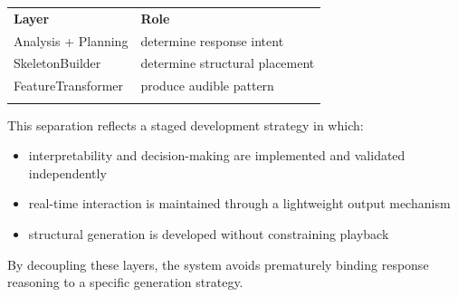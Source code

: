 {\def\LTcaptype{none} %
\begin{longtable}[]{@{}
  >{\raggedright\arraybackslash}p{}
  >{\raggedright\arraybackslash}p{}@{}}
\toprule\noalign{}
\begin{minipage}[b]{\linewidth}\centering
\textbf{Layer}
\end{minipage} & \begin{minipage}[b]{\linewidth}\centering
\textbf{Role}
\end{minipage} \\
\begin{minipage}[b]{\linewidth}\raggedright
Analysis + Planning
\end{minipage} & \begin{minipage}[b]{\linewidth}\raggedright
determine response intent
\end{minipage} \\
\begin{minipage}[b]{\linewidth}\raggedright
SkeletonBuilder
\end{minipage} & \begin{minipage}[b]{\linewidth}\raggedright
determine structural placement
\end{minipage} \\
\begin{minipage}[b]{\linewidth}\raggedright
FeatureTransformer
\end{minipage} & \begin{minipage}[b]{\linewidth}\raggedright
produce audible pattern
\end{minipage} \\
\midrule\noalign{}
\endhead
\bottomrule\noalign{}
\endlastfoot
\end{longtable}
}

This separation reflects a staged development strategy in which:

\begin{itemize}
\item
  interpretability and decision-making are implemented and validated
  independently
\item
  real-time interaction is maintained through a lightweight output
  mechanism
\item
  structural generation is developed without constraining playback
\end{itemize}

By decoupling these layers, the system avoids prematurely binding
response reasoning to a specific generation strategy.

